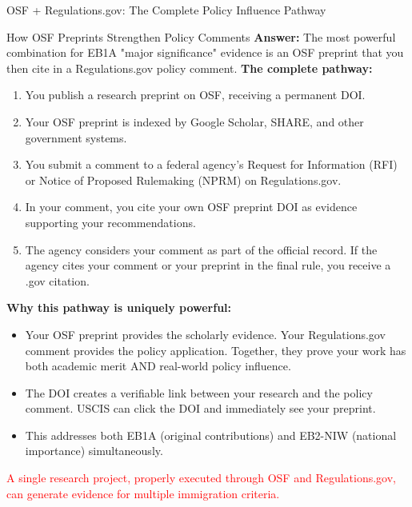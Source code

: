\documentclass[11pt]{beamer}
\begin{document}
	\begin{frame}{OSF + Regulations.gov: The Complete Policy Influence Pathway}
		\scriptsize
		\begin{block}{How OSF Preprints Strengthen Policy Comments}
			\textbf{Answer:} The most powerful combination for EB1A "major significance" evidence is an OSF preprint that you then cite in a Regulations.gov policy comment.
			\vspace{0.1cm}
			\textbf{The complete pathway:}
			\begin{enumerate}
				\item You publish a research preprint on OSF, receiving a permanent DOI.
				\item Your OSF preprint is indexed by Google Scholar, SHARE, and other government systems.
				\item You submit a comment to a federal agency's Request for Information (RFI) or Notice of Proposed Rulemaking (NPRM) on Regulations.gov.
				\item In your comment, you cite your own OSF preprint DOI as evidence supporting your recommendations.
				\item The agency considers your comment as part of the official record. If the agency cites your comment or your preprint in the final rule, you receive a .gov citation.
			\end{enumerate}
			\textbf{Why this pathway is uniquely powerful:}
			\begin{itemize}
				\item Your OSF preprint provides the scholarly evidence. Your Regulations.gov comment provides the policy application. Together, they prove your work has both academic merit AND real-world policy influence.
				\item The DOI creates a verifiable link between your research and the policy comment. USCIS can click the DOI and immediately see your preprint.
				\item This addresses both EB1A (original contributions) and EB2-NIW (national importance) simultaneously.
			\end{itemize}
			\textcolor{red}{A single research project, properly executed through OSF and Regulations.gov, can generate evidence for multiple immigration criteria.}
		\end{block}
	\end{frame}
	
\end{document}
